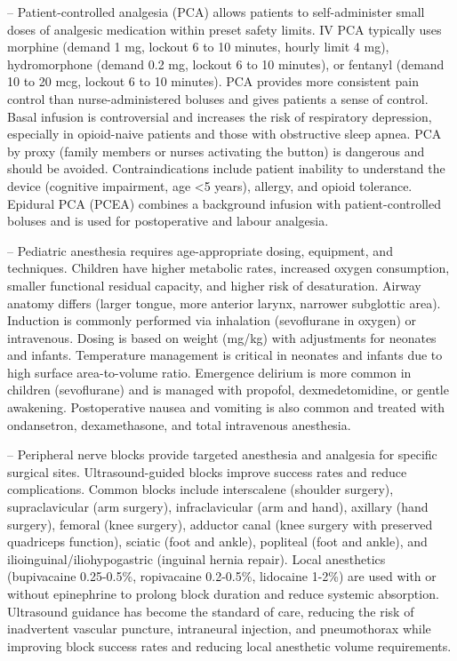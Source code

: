 -- Patient-controlled analgesia (PCA) allows patients to self-administer small doses of analgesic medication within preset safety limits. IV PCA typically uses morphine (demand 1 mg, lockout 6 to 10 minutes, hourly limit 4 mg), hydromorphone (demand 0.2 mg, lockout 6 to 10 minutes), or fentanyl (demand 10 to 20 mcg, lockout 6 to 10 minutes). PCA provides more consistent pain control than nurse-administered boluses and gives patients a sense of control. Basal infusion is controversial and increases the risk of respiratory depression, especially in opioid-naive patients and those with obstructive sleep apnea. PCA by proxy (family members or nurses activating the button) is dangerous and should be avoided. Contraindications include patient inability to understand the device (cognitive impairment, age <5 years), allergy, and opioid tolerance. Epidural PCA (PCEA) combines a background infusion with patient-controlled boluses and is used for postoperative and labour analgesia.

-- Pediatric anesthesia requires age-appropriate dosing, equipment, and techniques. Children have higher metabolic rates, increased oxygen consumption, smaller functional residual capacity, and higher risk of desaturation. Airway anatomy differs (larger tongue, more anterior larynx, narrower subglottic area). Induction is commonly performed via inhalation (sevoflurane in oxygen) or intravenous. Dosing is based on weight (mg/kg) with adjustments for neonates and infants. Temperature management is critical in neonates and infants due to high surface area-to-volume ratio. Emergence delirium is more common in children (sevoflurane) and is managed with propofol, dexmedetomidine, or gentle awakening. Postoperative nausea and vomiting is also common and treated with ondansetron, dexamethasone, and total intravenous anesthesia.

-- Peripheral nerve blocks provide targeted anesthesia and analgesia for specific surgical sites. Ultrasound-guided blocks improve success rates and reduce complications. Common blocks include interscalene (shoulder surgery), supraclavicular (arm surgery), infraclavicular (arm and hand), axillary (hand surgery), femoral (knee surgery), adductor canal (knee surgery with preserved quadriceps function), sciatic (foot and ankle), popliteal (foot and ankle), and ilioinguinal/iliohypogastric (inguinal hernia repair). Local anesthetics (bupivacaine 0.25-0.5\%, ropivacaine 0.2-0.5\%, lidocaine 1-2\%) are used with or without epinephrine to prolong block duration and reduce systemic absorption. Ultrasound guidance has become the standard of care, reducing the risk of inadvertent vascular puncture, intraneural injection, and pneumothorax while improving block success rates and reducing local anesthetic volume requirements.


